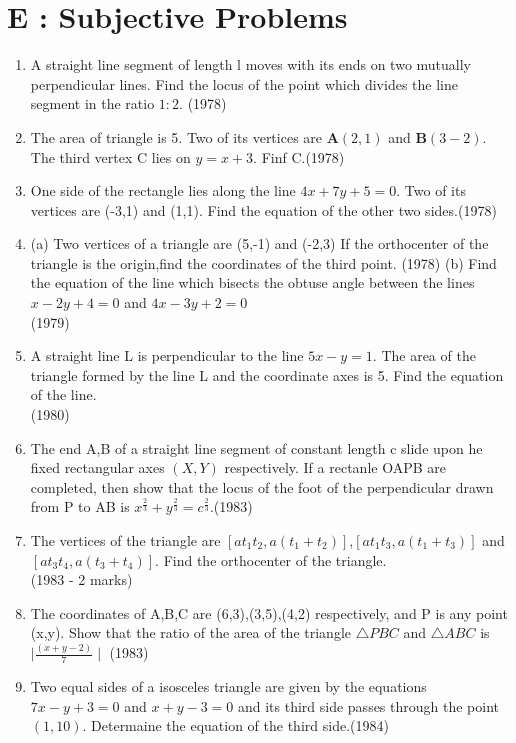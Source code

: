 \documentclass[12pt]{article}
\let\vec\mathbf
\begin{document}
\section*{E  :  Subjective Problems}

\begin{enumerate}
		\fi
\item  A straight line segment of length l moves with its ends on two mutually perpendicular lines. Find the locus of the point which divides the line segment in the ratio $1:2$. (1978)
\item The area of triangle is 5. Two of its vertices are $\vec{A}(2,1)$ and $\vec{B}(3-2)$. The third vertex C lies on $y=x+3$. Finf C.(1978)
\item One side of the rectangle lies along the line $4x+7y+5=0$. Two of its vertices are (-3,1) and (1,1). Find the equation of the other two sides.(1978)
\item(a) Two vertices of a triangle are (5,-1) and (-2,3) If the orthocenter of the triangle is the origin,find the coordinates of the third point. (1978)
(b) Find the equation of the line which bisects the obtuse angle between the lines $x-2y+4=0$ and $4x-3y+2=0$\\ (1979)
\item  A straight line L is perpendicular to the line $5x-y=1$. The area of the triangle formed by the line L and the coordinate axes is 5. Find the equation of the line.\\ (1980)
\item The end A,B of a straight line segment of constant length c slide upon he fixed rectangular axes $(X,Y)$ respectively. If a rectanle OAPB are completed, then show that the locus of the foot of the perpendicular drawn from P to AB is $x^\frac{2}{3}+y^\frac{2}{3}=c^\frac{2}{3}$.(1983)\\
\item The vertices of the triangle are $[at_1t_2,a(t_1+t_2)]$,$[at_1t_3,a(t_1+t_3)]$ and $[at_3t_4,a(t_3+t_4)]$. Find the orthocenter of the triangle.\\ (1983 - 2 marks)
\item The coordinates of A,B,C are  (6,3),(3,5),(4,2) respectively, and P is any point (x,y). Show that the ratio of the area of the triangle $\triangle PBC$ and $\triangle ABC $ is $\mid\frac{(x+y-2)}{7}\mid$ (1983)\\
\item Two equal sides of a isosceles triangle are given by the equations $7x-y+3=0$ and $x+y-3=0$ and its third side passes through the point $(1,10)$. Determaine the equation of the third side.(1984)\\

\end{enumerate}
\end{document}
